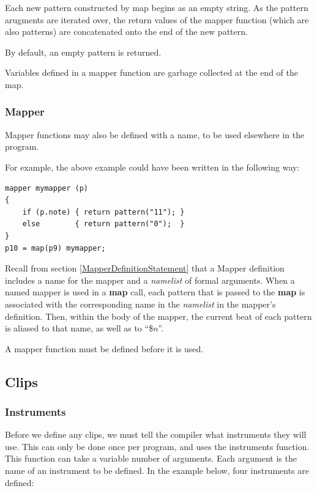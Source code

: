 Each new pattern constructed by map begins as an empty string.  As the pattern arugments are iterated over, the return values of the mapper function (which are also patterns) are concatenated onto the end of the new pattern.

By default, an empty pattern is returned.

Variables defined in a mapper function are garbage collected at the end of the map.

\subsubsection{Mapper}

Mapper functions may also be defined with a name, to be used elsewhere in the program.

For example, the above example could have been written in the following way:
\begin{verbatim}
mapper mymapper (p)
{
    if (p.note) { return pattern("11"); }
    else        { return pattern("0");  }
}
p10 = map(p9) mymapper;
\end{verbatim}

Recall from section \ref{MapperDefinitionStatement} that a  Mapper definition includes a name for the mapper and  a \emph{namelist} of formal arguments.
When a named mapper is used in a \textbf{map} call, each pattern that is passed to the \textbf{map} is associated with the corresponding name in the \emph{namelist} in the mapper's definition.
Then, within the body of the mapper, the current beat of each pattern is aliased to that name, as well as to ``\$$n$''.

A mapper function must be defined before it is used.





\subsection{Clips}

\subsubsection{Instruments}

Before we define any clips, we must tell the compiler what instruments they will use.
This can only be done once per program, and uses the instruments function.  This function can take a variable number of arguments.  Each argument is the name of an instrument to be defined.  In the example below, four instruments are defined:

